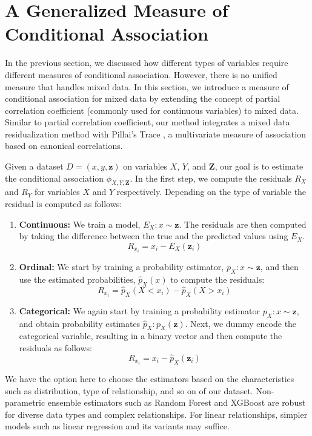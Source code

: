 \section{A Generalized Measure of Conditional Association}
\label{sec:mixed_association}

In the previous section, we discussed how different types of variables require
different measures of conditional association. However, there is no unified
measure that handles mixed data. In this section, we introduce a measure of conditional
association for mixed data by extending the concept of partial correlation
coefficient (commonly used for continuous variables) to mixed data. Similar to
partial correlation coefficient, our method integrates a mixed data
residualization method \citep{Ankan2023} with Pillai's Trace
\citep{Pillai1955}, a multivariate measure of association based on canonical
correlations.
 
Given a dataset $ D = (x, y, \bm{z}) $ on variables $ X $, $ Y $, and $ \bm{Z}
$, our goal is to estimate the conditional association $ \phi_{X, Y; \bm{Z}} $. 
In the first step, we compute the residuals $ R_X $ and $ R_Y $ for variables
$ X $ and $ Y $ respectively. Depending on the type of variable the residual
is computed as follows:

\begin{enumerate}
	\item \textbf{Continuous:} We train a model, $ E_X: x \sim
		\bm{z} $. The residuals are then computed by taking the difference
		between the true and the predicted values using $ E_X $. 
		$$ R_{x_i} = x_i - E_X(\bm{z}_i) $$
	\item \textbf{Ordinal:} We start by training a probability estimator, $
		p_X: x \sim \bm{z} $, and then use the estimated probabilities, 
		$ \hat{p}_X(x) $ to compute the residuals:
		$$ R_{x_i} = \hat{p}_X(X < x_i) - \hat{p}_X(X > x_i) $$
	\item \textbf{Categorical:} We again start by training a probability
		estimator $ p_X: x \sim \bm{z} $, and obtain probability
		estimates $ \hat{p}_X: p_X(\bm{z}) $. Next, we dummy encode the
		categorical variable, resulting in a binary vector and then
		compute the residuals as follows: 
		$$ R_{x_i} = x_i - \hat{p}_X(\bm{z}_i) $$
\end{enumerate}

We have the option here to choose the estimators based on the characteristics
such as distribution, type of relationship, and so on of our dataset.
Non-parametric ensemble estimators such as Random Forest and XGBoost are robust 
for diverse data types and complex relationships. For linear relationships,
simpler models such as linear regression and its variants may suffice.

